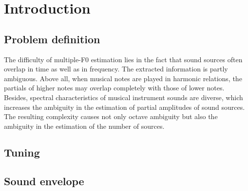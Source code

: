 \chapter{Introduction}\label{ch:introduction}


\section{Problem definition}\label{sec:problem-definition}



The difficulty of multiple-F0 estimation lies in the fact that sound sources often overlap in time as well as in frequency. The extracted information is partly ambiguous.
Above all, when musical notes are played in harmonic relations, the partials of higher
notes may overlap completely with those of lower notes. Besides, spectral characteristics of musical instrument sounds are diverse, which increases the ambiguity in the
estimation of partial amplitudes of sound sources. The resulting complexity causes
not only octave ambiguity but also the ambiguity in the estimation of the number of
sources.


\section{Tuning}\label{sec:tuning}
\section{Sound envelope}\label{sec:sound-envelope}
